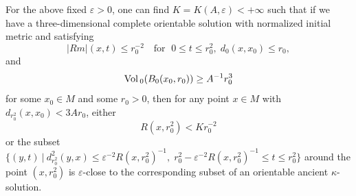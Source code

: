 \begin{lemma}
  \label{lem:cz-local-ancient-model-alternative}
For the above fixed $\varepsilon>0$, one can find
$K=K(A,\varepsilon)<+\infty$ such that if we have a
three-dimensional complete orientable solution with normalized
initial metric and satisfying
$$
|Rm|(x,t)\le r_0^{-2}\quad \mbox{for }\; 0\le t\le
r_0^2,\;d_0(x,x_0)\le r_0,
$$
and
$$
{\rm Vol}\,_0(B_0(x_0,r_0))\ge A^{-1}r_0^3
$$
for some $x_0 \in M$ and some $r_0 > 0$, then for any point $x\in
M$ with $d_{r_0^2}(x,x_0)<3Ar_0$, either $$R(x,r_0^2)< Kr_0^{-2}$$
or the subset $\{(y,t)\ |\ d_{r_0^2}^2(y,x)\leq \varepsilon^{-2}
R(x,r_0^2)^{-1},\;r_0^2-\varepsilon^{-2} R(x,r_0^2)^{-1}\le t\le
r_0^2\}$ around the point $(x,r_0^2)$ is $\varepsilon$-close to
the corresponding subset of an orientable ancient
$\kappa$-solution.
\medskip

\end{lemma}
